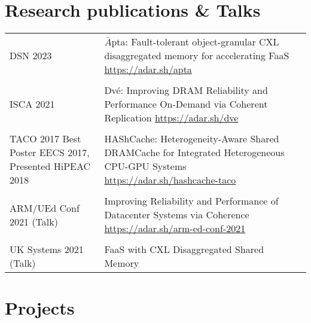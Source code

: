 \documentclass[a4paper,10pt]{article} %
\begin{document}
\section{Research publications \& Talks}
\begin{tabular}{p{3cm}p{11cm}}
DSN 2023 &  $\bar{A}$pta: Fault-tolerant object-granular CXL disaggregated memory for \newline accelerating FaaS \hfill \href{https://adar.sh/apta}{https://adar.sh/apta}\\
& \\
ISCA 2021 & Dv\'e: Improving DRAM Reliability and Performance On-Demand via \newline Coherent Replication \hfill  \href{https://adar.sh/dve}{https://adar.sh/dve}\\
&\\
TACO 2017 \newline \footnotesize{Best Poster EECS 2017, Presented HiPEAC 2018} & HAShCache: Heterogeneity-Aware Shared DRAMCache for Integrated Heterogeneous CPU-GPU Systems  \hfill
\href{https://adar.sh/hashcache-taco}{https://adar.sh/hashcache-taco}\\
&\\
ARM/UEd Conf 2021 \footnotesize{(Talk)} & Improving Reliability and Performance of Datacenter Systems via \newline Coherence \hfill  \href{https://adar.sh/arm-ed-conf-2021}{https://adar.sh/arm-ed-conf-2021}\\	
&\\
UK Systems 2021 \footnotesize{(Talk)} & FaaS with CXL Disaggregated Shared Memory
\end{tabular}

\vspace{0.05in}

\section{Projects}
\end{document}
